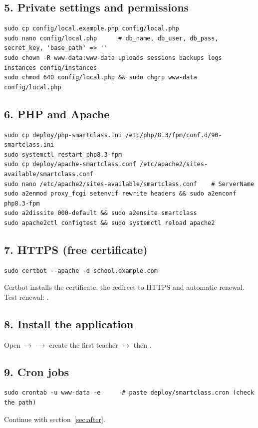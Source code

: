 \documentclass[11pt,a4paper]{article}
\begin{document}
\subsection{5. Private settings and permissions}
\begin{lstlisting}
sudo cp config/local.example.php config/local.php
sudo nano config/local.php      # db_name, db_user, db_pass, secret_key, 'base_path' => ''
sudo chown -R www-data:www-data uploads sessions backups logs instances config/instances
sudo chmod 640 config/local.php && sudo chgrp www-data config/local.php
\end{lstlisting}
\subsection{6. PHP and Apache}
\begin{lstlisting}
sudo cp deploy/php-smartclass.ini /etc/php/8.3/fpm/conf.d/90-smartclass.ini
sudo systemctl restart php8.3-fpm
sudo cp deploy/apache-smartclass.conf /etc/apache2/sites-available/smartclass.conf
sudo nano /etc/apache2/sites-available/smartclass.conf    # ServerName
sudo a2enmod proxy_fcgi setenvif rewrite headers && sudo a2enconf php8.3-fpm
sudo a2dissite 000-default && sudo a2ensite smartclass
sudo apache2ctl configtest && sudo systemctl reload apache2
\end{lstlisting}
\subsection{7. HTTPS (free certificate)}
\begin{lstlisting}
sudo certbot --apache -d school.example.com
\end{lstlisting}
Certbot installs the certificate, the redirect to HTTPS and automatic renewal. Test renewal: .
\subsection{8. Install the application}
Open  $\rightarrow$  $\rightarrow$ create the first teacher $\rightarrow$ then .
\subsection{9. Cron jobs}
\begin{lstlisting}
sudo crontab -u www-data -e      # paste deploy/smartclass.cron (check the path)
\end{lstlisting}
Continue with section~\ref{sec:after}.
\end{document}
